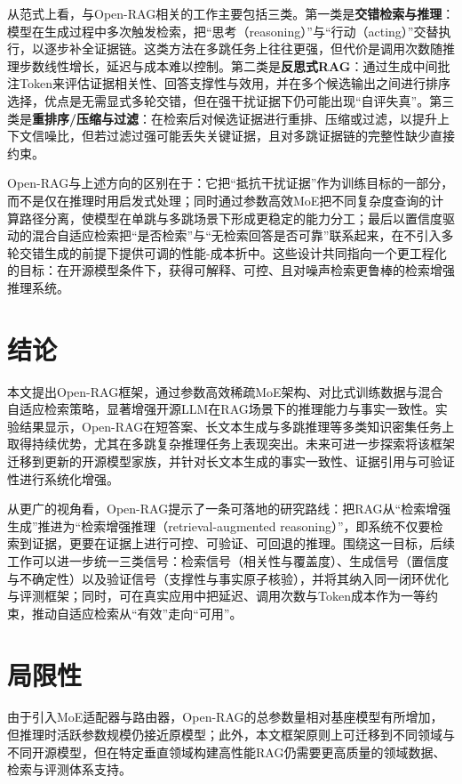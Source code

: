 从范式上看，与Open-RAG相关的工作主要包括三类。第一类是\textbf{交错检索与推理}：模型在生成过程中多次触发检索，把“思考（reasoning）”与“行动（acting）”交替执行，以逐步补全证据链。这类方法在多跳任务上往往更强，但代价是调用次数随推理步数线性增长，延迟与成本难以控制。第二类是\textbf{反思式RAG}：通过生成中间批注Token来评估证据相关性、回答支撑性与效用，并在多个候选输出之间进行排序选择，优点是无需显式多轮交错，但在强干扰证据下仍可能出现“自评失真”。第三类是\textbf{重排序/压缩与过滤}：在检索后对候选证据进行重排、压缩或过滤，以提升上下文信噪比，但若过滤过强可能丢失关键证据，且对多跳证据链的完整性缺少直接约束。

Open-RAG与上述方向的区别在于：它把“抵抗干扰证据”作为训练目标的一部分，而不是仅在推理时用启发式处理；同时通过参数高效MoE把不同复杂度查询的计算路径分离，使模型在单跳与多跳场景下形成更稳定的能力分工；最后以置信度驱动的混合自适应检索把“是否检索”与“无检索回答是否可靠”联系起来，在不引入多轮交错生成的前提下提供可调的性能-成本折中。这些设计共同指向一个更工程化的目标：在开源模型条件下，获得可解释、可控、且对噪声检索更鲁棒的检索增强推理系统。
 
\section{结论}
本文提出Open-RAG框架，通过参数高效稀疏MoE架构、对比式训练数据与混合自适应检索策略，显著增强开源LLM在RAG场景下的推理能力与事实一致性。实验结果显示，Open-RAG在短答案、长文本生成与多跳推理等多类知识密集任务上取得持续优势，尤其在多跳复杂推理任务上表现突出。未来可进一步探索将该框架迁移到更新的开源模型家族，并针对长文本生成的事实一致性、证据引用与可验证性进行系统化增强。

从更广的视角看，Open-RAG提示了一条可落地的研究路线：把RAG从“检索增强生成”推进为“检索增强推理（retrieval-augmented reasoning）”，即系统不仅要检索到证据，更要在证据上进行可控、可验证、可回退的推理。围绕这一目标，后续工作可以进一步统一三类信号：检索信号（相关性与覆盖度）、生成信号（置信度与不确定性）以及验证信号（支撑性与事实原子核验），并将其纳入同一闭环优化与评测框架；同时，可在真实应用中把延迟、调用次数与Token成本作为一等约束，推动自适应检索从“有效”走向“可用”。
 
\section{局限性}
\noindent 由于引入MoE适配器与路由器，Open-RAG的总参数量相对基座模型有所增加，但推理时活跃参数规模仍接近原模型；此外，本文框架原则上可迁移到不同领域与不同开源模型，但在特定垂直领域构建高性能RAG仍需要更高质量的领域数据、检索与评测体系支持。

